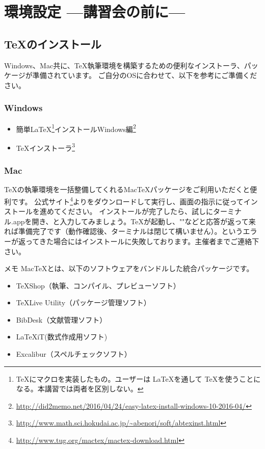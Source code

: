 \documentclass[TeXworkshop]{subfiles}
\begin{document}
\section{環境設定 ---講習会の前に---}

\subsection*{\TeX のインストール}
Windows、Mac共に、\TeX 執筆環境を構築するための便利なインストーラ、パッケージが準備されています。
ご自分のOSに合わせて、以下を参考にご準備ください。

\subsubsection*{Windows}

\begin{itemize}
\item 簡単\LaTeX\footnote{\TeX にマクロを実装したもの。ユーザーは \LaTeX を通して \TeX を使うことになる。本講習では両者を区別しない。}インストールWindows編\footnote{\url{http://did2memo.net/2016/04/24/easy-latex-install-windows-10-2016-04/}}
\item \TeX インストーラ\footnote{\url{http://www.math.sci.hokudai.ac.jp/~abenori/soft/abtexinst.html}}
\end{itemize}

\subsubsection*{Mac}
\TeX の執筆環境を一括整備してくれるMac\TeX パッケージをご利用いただくと便利です。
公式サイト\footnote{\url{http://www.tug.org/mactex/mactex-download.html}}よりをダウンロードして実行し、画面の指示に従ってインストールを進めてください。
インストールが完了したら、試しにターミナル.appを開き、と入力してみましょう。\TeX が起動し、""などと応答が返って来れば準備完了です（動作確認後、ターミナルは閉じて構いません）。というエラーが返ってきた場合にはインストールに失敗しております。主催者までご連絡下さい。

\begin{itembox}[l]{メモ}
Mac\TeX とは、以下のソフトウェアをバンドルした統合パッケージです。
\begin{itemize}
	\item{\TeX Shop}（執筆、コンパイル、プレビューソフト）
	\item{\TeX Live Utility}（パッケージ管理ソフト）
	\item{BibDesk}（文献管理ソフト）
	\item{\LaTeX iT}(数式作成用ソフト)
	\item{Excalibur}（スペルチェックソフト）
\end{itemize}
\end{itembox}
\end{document}
